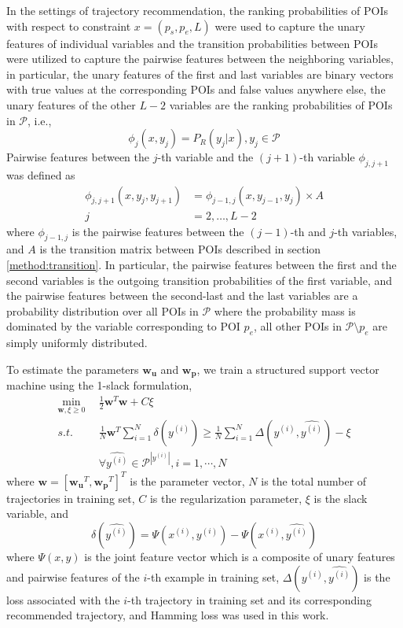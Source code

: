In the settings of trajectory recommendation, the ranking probabilities of POIs
with respect to constraint $x = (p_s, p_e, L)$ were used to capture the unary features of individual variables
and the transition probabilities between POIs were utilized to capture the pairwise features
between the neighboring variables, in particular,
the unary features of the first and last variables are binary vectors
with true values at the corresponding POIs and false values anywhere else,
the unary features of the other $L-2$ variables are the ranking probabilities of POIs in $\mathcal{P}$, i.e.,
\begin{displaymath}
    \phi_j(x, y_j) = P_R(y_j | x), y_j \in \mathcal{P}
\end{displaymath}
Pairwise features between the $j$-th variable and the $(j+1)$-th variable $\phi_{j, j+1}$ was defined as
\begin{align*}
    \phi_{j, j+1}(x, y_j, y_{j+1}) &= \phi_{j-1, j}(x, y_{j-1}, y_j) \times A \\
                                 j &=2, \dots, L-2
\end{align*}
where $\phi_{j-1, j}$ is the pairwise features between the $(j-1)$-th and $j$-th variables,
and $A$ is the transition matrix between POIs described in section \ref{method:transition}.
In particular, the pairwise features between the first and the second variables is the
outgoing transition probabilities of the first variable,
and the pairwise features between the second-last and the last variables are a probability distribution
over all POIs in $\mathcal{P}$ where the probability mass is dominated by the variable corresponding to POI $p_e$,
all other POIs in $\mathcal{P} \setminus p_e$ are simply uniformly distributed.


To estimate the parameters $\mathbf{w_u}$ and $\mathbf{w_p}$, we train a structured support vector machine
using the 1-slack formulation\cite{ssvm09},
\begin{align*}
    \min_{\mathbf{w}, \xi \ge 0} ~~& \frac{1}{2} \mathbf{w}^T \mathbf{w} + C \xi \\
    s.t. ~~& \frac{1}{N} \mathbf{w}^T \sum_{i=1}^N \delta(\hat{y^{(i)}}) \ge
                  \frac{1}{N} \sum_{i=1}^N \Delta(y^{(i)}, \hat{y^{(i)}}) - \xi \\
         ~~& \forall \hat{y^{(i)}} \in \mathcal{P}^{|y^{(i)}|}, i = 1, \cdots, N
\end{align*}
where $\mathbf{w} = [\mathbf{w_u}^T, \mathbf{w_p}^T]^T$ is the parameter vector,
$N$ is the total number of trajectories in training set, $C$ is the regularization parameter,
$\xi$ is the slack variable, and
\begin{displaymath}
    \delta(\hat{y^{(i)}}) = \Psi(x^{(i)}, y^{(i)}) - \Psi(x^{(i)}, \hat{y^{(i)}})
\end{displaymath}
where $\Psi(x, y)$ is the joint feature vector which is a composite of unary features and pairwise features of the
$i$-th example in training set,
$\Delta(y^{(i)}, \hat{y^{(i)}})$ is the loss associated with the $i$-th trajectory in training set and
its corresponding recommended trajectory, and Hamming loss was used in this work.

